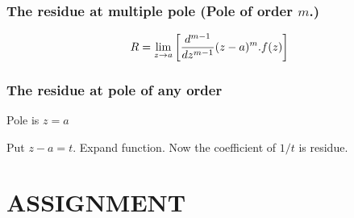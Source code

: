  \subsubsection{The residue at multiple pole (Pole of order $m$.) }
 \[R = \lim_{z\rightarrow a}\left[{d^{m-1} \over {dz^{m-1}}}(z-a)^m.f(z)\right]\]
 
 \subsubsection{The residue at pole of any order}
 Pole is $z=a$
 
 Put $z-a = t$. Expand function. Now the coefficient of $1/t$ is residue.

\section{ASSIGNMENT}
